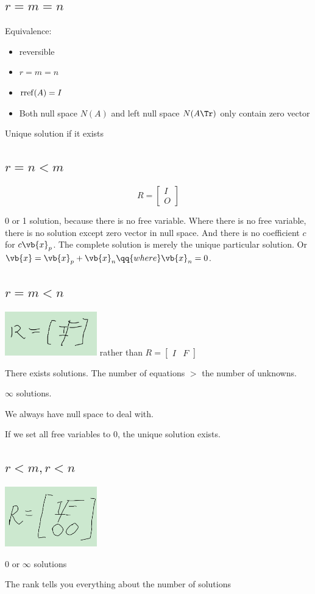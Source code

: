 \subsection{\( r = m = n \)}%
Equivalence:
\begin{itemize}
	\item reversible
	\item \( r = m = n \)
	\item \( \operatorname{rref}(A) = I \)
	\item Both null space \( N(A) \) and left null space \( N(A\Tr) \) only contain zero vector
\end{itemize}

Unique solution if it exists
\subsection{\( r = n < m \)}%
\begin{equation*}
	R =
	\begin{bmatrix}
		I \\ O
	\end{bmatrix}
\end{equation*}

0 or 1 solution, because there is no free variable.
Where there is no free variable, there is no solution except zero vector in null space.
And there is no coefficient \(c\) for \( c \vb{x}_{p} \).
The complete solution is merely the unique particular solution.
Or \(\vb{x} = \vb{x}_p + \vb{x}_n \qq{where} \vb{x}_n = 0 \).

\subsection{\( r = m <n \)}%

\includegraphics[width=0.3\textwidth]{figures/2021-09-17T190337+0800.png}
rather than
\(
R =
\begin{bmatrix}
	I & F
\end{bmatrix}
\)

There exists solutions. The number of equations \(>\) the number of unknowns.

\( \infty \) solutions.

We always have null space to deal with.

If we set all free variables to \(0\), the unique solution exists.

\subsection{\( r < m, r < n  \)}%
\includegraphics[width=0.3\textwidth]{figures/2021-09-17T191029+0800.png}

0 or \( \infty \) solutions

\begin{remark}
	The rank tells you everything about the number of solutions
\end{remark}

